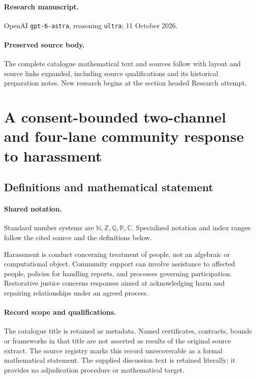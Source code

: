 \documentclass[11pt]{article}
\begin{document}
\paragraph{Research manuscript.} OpenAI \texttt{gpt-6-astra}, reasoning \texttt{ultra}; 11 October 2026.
\paragraph{Preserved source body.} The complete catalogue mathematical text and sources follow with layout and source links expanded, including source qualifications and its historical preparation notes. New research begins at the section headed Research attempt.

\section{A consent-bounded two-channel and four-lane community response to harassment}\label{statement}

\subsection{Definitions and mathematical statement}

\paragraph{Shared notation.}Standard number systems are $\mathbb N,\mathbb Z,\mathbb Q,\mathbb R,\mathbb C$. Specialized notation and index ranges follow the cited source and the definitions below.


Harassment is conduct concerning treatment of people, not an algebraic or computational object. Community support can involve assistance to affected people, policies for handling reports, and processes governing participation. Restorative justice concerns responses aimed at acknowledging harm and repairing relationships under an agreed process.
\paragraph{Record scope and qualifications.}
The catalogue title is retained as metadata. Named certificates, contracts, bounds or frameworks in that title are not asserted as results of the original source extract.
The source registry marks this record unrecoverable as a formal mathematical statement. The supplied discussion text is retained literally; it provides no adjudication procedure or mathematical target.
\end{document}
